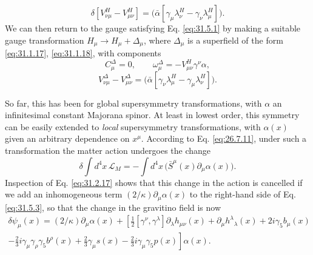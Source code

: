 \begin{equation}
  \delta[V_{\nu\mu}^H-V_{\mu\nu}^H]
  =\bigl(\bar\alpha
    [\gamma_\mu\lambda_\nu^H-\gamma_\nu\lambda_\mu^H]\bigr).
  \tag{31.5.8}\label{eq:31.5.8}
\end{equation}
We can then return to the gauge satisfying Eq. \eqref{eq:31.5.1} by
making a suitable gauge transformation \(H_\mu\longrightarrow
H_\mu+\Delta_\mu\), where \(\Delta_\mu\) is a superfield of the form
\eqref{eq:31.1.17}, \eqref{eq:31.1.18}, with components
\begin{equation}
  C_\mu^\Delta=0,\qquad
  \omega_\mu^\Delta=-V_{\mu\nu}^H\gamma^\nu\alpha,
  \tag{31.5.9}\label{eq:31.5.9}
\end{equation}
\begin{equation}
  V_{\nu\mu}^\Delta-V_{\mu\nu}^\Delta
  =\bigl(\bar\alpha
    [\gamma_\nu\lambda_\mu^H-\gamma_\mu\lambda_\nu^H]\bigr).
  \tag{31.5.10}\label{eq:31.5.10}
\end{equation}

So far, this has been for global supersymmetry transformations, with
\(\alpha\) an infinitesimal constant Majorana spinor. At least in lowest
order, this symmetry can be easily extended to \emph{local}
supersymmetry transformations, with \(\alpha(x)\) given an arbitrary
dependence on \(x^\mu\). According to Eq. \eqref{eq:26.7.11}, under such
a transformation the matter action undergoes the change
\begin{equation}
  \delta\int d^4x\,\mathcal{L}_M
  =-\int d^4x\,
    \bigl(\bar S^\mu(x)\partial_\mu\alpha(x)\bigr).
  \tag{31.5.11}\label{eq:31.5.11}
\end{equation}
Inspection of Eq. \eqref{eq:31.2.17} shows that this change in the action
is cancelled if we add an inhomogeneous term
\((2/\kappa)\partial_\mu\alpha(x)\) to the right-hand side of
Eq. \eqref{eq:31.5.3}, so that the change in the gravitino field is now
\begin{multline}
  \delta\psi_\mu(x)
  =(2/\kappa)\partial_\mu\alpha(x)
  +\left[
      \frac{1}{2}[\gamma^\nu,\gamma^\lambda]
        \partial_\lambda h_{\mu\nu}(x)
      +\partial_\mu h^\lambda{}_\lambda(x)
      +2i\gamma_5b_\mu(x)\right.\\
  \left.
      -\frac{2}{3}i\gamma_\mu\gamma_\rho\gamma_5b^\rho(x)
      +\frac{2}{3}\gamma_\mu s(x)
      -\frac{2}{3}i\gamma_\mu\gamma_5p(x)
    \right]\alpha(x).
  \tag{31.5.12}\label{eq:31.5.12}
\end{multline}

